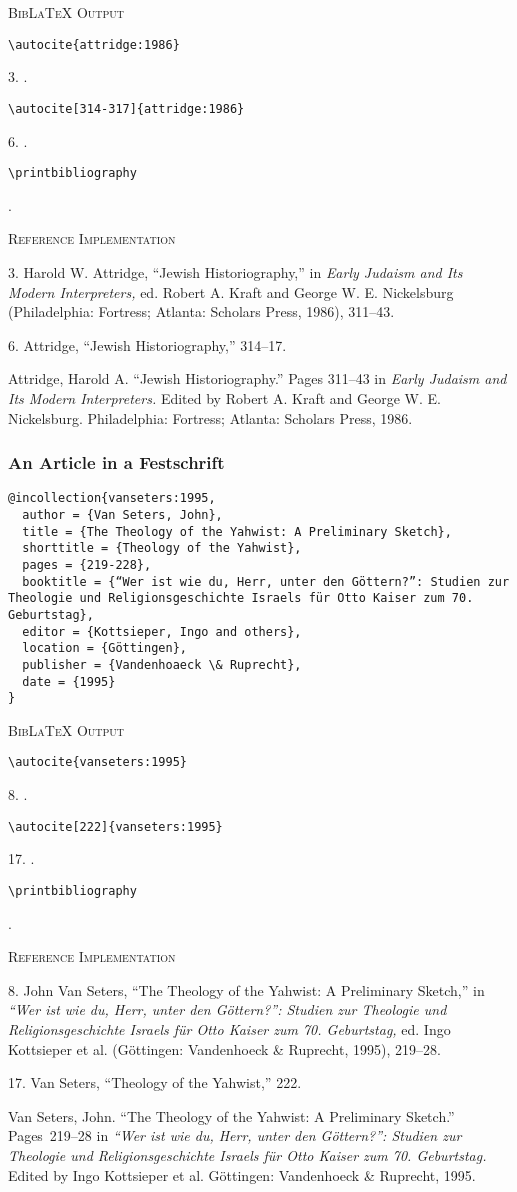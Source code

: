 \documentclass[a4paper]{article}
\newcommand\citetestnpf[4]{%
  {\textsc{BibLaTeX Output}\par
   \nobreak
   \texttt{\textbackslash autocite\{#4\}}\par
   \color{biblatex-colour}
   #1. \cite{#4}.\par
   \color{black}
   \texttt{\textbackslash autocite[#3]\{#4\}}\par
   \color{biblatex-colour}
   #2. \cite[#3]{#4}.\par
   \color{black}
   \texttt{\textbackslash printbibliography}\par
   \color{biblatex-colour}
   \hangindent\bibindent\bibentrycite{#4}.\par}}
\newenvironment{refimp}{%
  \begin{minipage}{\linewidth}
    \setlength{\parskip}{1ex}
    \textsc{Reference Implementation}\par
    \nobreak
    \color{reference-colour}
}{\end{minipage}}
\begin{document}
\citetestnpf{3}{6}{314-317}{attridge:1986}

\begin{refimp}
  3. Harold W. Attridge, “Jewish Historiography,” in \emph{Early Judaism and
  Its Modern Interpreters,} ed. Robert A. Kraft and George W. E. Nickelsburg
  (Philadelphia: Fortress; Atlanta: Scholars Press, 1986), 311–43.
  
  6. Attridge, “Jewish Historiography,” 314–17.

  Attridge, Harold A. “Jewish Historiography.” Pages 311–43 in \emph{Early
  Judaism and Its Modern Interpreters.} Edited by Robert A. Kraft and George
  W. E. Nickelsburg. Philadelphia: Fortress; Atlanta: Scholars Press, 1986.
\end{refimp}

\subsubsection{An Article in a Festschrift}

\begin{lstlisting}
@incollection{vanseters:1995,
  author = {Van Seters, John},
  title = {The Theology of the Yahwist: A Preliminary Sketch},
  shorttitle = {Theology of the Yahwist},
  pages = {219-228},
  booktitle = {“Wer ist wie du, Herr, unter den Göttern?”: Studien zur Theologie und Religionsgeschichte Israels für Otto Kaiser zum 70. Geburtstag},
  editor = {Kottsieper, Ingo and others},
  location = {Göttingen},
  publisher = {Vandenhoaeck \& Ruprecht},
  date = {1995}
}
\end{lstlisting}  

\citetestnpf{8}{17}{222}{vanseters:1995}

\begin{refimp}
  8. John Van Seters, “The Theology of the Yahwist: A Preliminary Sketch,” in
  \emph{“Wer ist wie du, Herr, unter den Göttern?”: Studien zur Theologie und
  Religionsgeschichte Israels für Otto Kaiser zum 70. Geburtstag,} ed. Ingo
  Kottsieper et al. (Göttingen: Vandenhoeck \& Ruprecht, 1995), 219–28.

  17. Van Seters, “Theology of the Yahwist,” 222.

  \hangindent\bibindent Van Seters, John. “The Theology of the Yahwist: A
  Preliminary Sketch.” Pages~219–28 in \emph{“Wer ist wie du, Herr, unter den
  Göttern?”: Studien zur Theologie und Religionsgeschichte Israels für Otto
  Kaiser zum 70. Geburtstag.} Edited by Ingo Kottsieper et al. Göttingen:
  Vandenhoeck \& Ruprecht, 1995.
\end{refimp}
\end{document}
